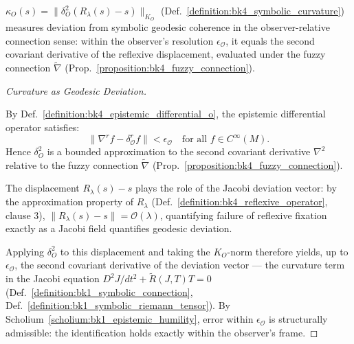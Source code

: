 \begin{proposition}
\label{proposition:bk4_geodesic_failure}
$\kappa_O(s) = \|\delta_O^2(R_\lambda(s) - s)\|_{K_O}$
(Def.~\ref{definition:bk4_symbolic_curvature}) measures deviation from symbolic geodesic
coherence in the observer-relative connection sense: within the observer's resolution
$\epsilon_\mathcal{O}$, it equals the second covariant derivative of the reflexive
displacement, evaluated under the fuzzy connection $\tilde{\nabla}$
(Prop.~\ref{proposition:bk4_fuzzy_connection}).
\end{proposition}

\begin{proof}[Curvature as Geodesic Deviation]
\label{proof:bk4_geodesic_failure}
\leavevmode

By Def.~\ref{definition:bk4_epistemic_differential_o}, the epistemic differential
operator satisfies:
\[
\|\nabla^r f - \delta^r_\mathcal{O} f\| < \epsilon_\mathcal{O}
\quad \text{for all } f \in C^\infty(M).
\]
Hence $\delta_O^2$ is a bounded approximation to
the second covariant derivative $\nabla^2$ relative to the fuzzy connection
$\tilde{\nabla}$ (Prop.~\ref{proposition:bk4_fuzzy_connection}).

The displacement $R_\lambda(s) - s$ plays the role of the Jacobi deviation vector:
by the approximation property of $R_\lambda$ (Def.~\ref{definition:bk4_reflexive_operator},
clause 3), $\|R_\lambda(s) - s\| = \mathcal{O}(\lambda)$, quantifying failure of
reflexive fixation exactly as a Jacobi field quantifies geodesic deviation.

Applying $\delta_O^2$ to this displacement and taking the $K_O$-norm therefore yields,
up to $\epsilon_\mathcal{O}$, the second covariant derivative of the deviation vector ---
the curvature term in the Jacobi equation $D^2 J/dt^2 + \tilde{R}(J,T)T = 0$
(Def.~\ref{definition:bk1_symbolic_connection}, Def.~\ref{definition:bk1_symbolic_riemann_tensor}).
By Scholium~\ref{scholium:bk1_epistemic_humility}, error within $\epsilon_\mathcal{O}$ is
structurally admissible: the identification holds exactly within the observer's frame.
\end{proof}

